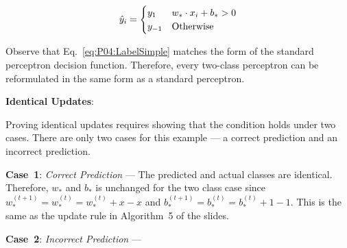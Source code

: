\begin{equation}\label{eq:P04:LabelSimple}
  \hat{y}_{i} = \begin{cases}
                  y_{1} & w_{*} \cdot x_{i} + b_{*} > 0 \\
                  y_{-1} & \text{Otherwise}
                \end{cases}
\end{equation}

\noindent
Observe that Eq.~\eqref{eq:P04:LabelSimple} matches the form of the standard perceptron decision function.  Therefore, every two-class perceptron can be reformulated in the same form as a standard perceptron.

\noindent
{\Large \textbf{Identical Updates}:}

Proving identical updates requires showing that the condition holds under two cases.  There are only two cases for this example --- a correct prediction and an incorrect prediction.

\noindent
\textbf{Case~1}: \textit{Correct Prediction} --- The predicted and actual classes are identical.  Therefore, $w_{*}$ and $b_{*}$ is unchanged for the two class case since $w_{*}^{(t+1)} = w^{(t)}_{*} = w^{(t)}_{*} + x -x$ and $b^{(t+1)}_{*} = b^{(t)}_{*} = b^{(t)}_{*} + 1 - 1$. This is the same as the update rule in Algorithm~5 of the slides.

\noindent
\textbf{Case~2}: \textit{Incorrect Prediction} ---

